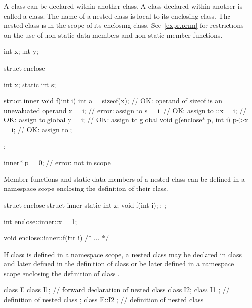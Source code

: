 \pnum
A class can be declared within another class. A class declared within
another is called a  class. The name of a nested class
is local to its enclosing class.
%
The nested class is in the scope of its enclosing class.
\enternote
See~\ref{expr.prim} for restrictions on the use of non-static data
members and non-static member functions.
\exitnote

%
\enterexample

\begin{codeblock}
int x;
int y;

struct enclose {
  int x;
  static int s;

  struct inner {
    void f(int i) {
      int a = sizeof(x);        // OK: operand of sizeof is an unevaluated operand
      x = i;                    // error: assign to 
      s = i;                    // OK: assign to 
      ::x = i;                  // OK: assign to global 
      y = i;                    // OK: assign to global 
    }
    void g(enclose* p, int i) {
      p->x = i;                 // OK: assign to 
    }
  };
};

inner* p = 0;                   // error:  not in scope
\end{codeblock}
\exitexample

\pnum
Member functions and static data members of a nested class can be
defined in a namespace scope enclosing the definition of their class.
%
\enterexample

\begin{codeblock}
struct enclose {
  struct inner {
    static int x;
    void f(int i);
  };
};

int enclose::inner::x = 1;

void enclose::inner::f(int i) { /* ... */ }
\end{codeblock}
\exitexample

\pnum
If class  is defined in a namespace scope, a nested class
 may be declared in class  and later defined in the
definition of class  or be later defined in a namespace scope
enclosing the definition of class .
%
\enterexample

\begin{codeblock}
class E {
  class I1;                     // forward declaration of nested class
  class I2;
  class I1 { };                 // definition of nested class
};
class E::I2 { };                // definition of nested class
\end{codeblock}
\exitexample

